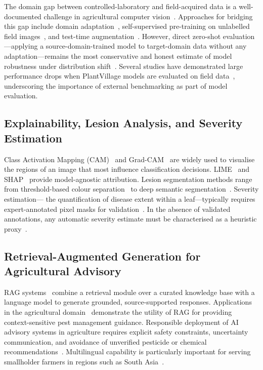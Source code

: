 \documentclass[conference]{IEEEtran}
\begin{document}
The domain gap between controlled-laboratory and field-acquired data is a
well-documented challenge in agricultural computer vision~\cite{barbedo2018factors,
sun2016deep}. Approaches for bridging this gap include domain adaptation~\cite{ganin2015unsupervised,long2015learning},
self-supervised pre-training on unlabelled field images~\cite{chen2020simple,he2020momentum},
and test-time augmentation~\cite{krizhevsky2012imagenet}. However, direct
zero-shot evaluation---applying a source-domain-trained model to target-domain
data without any adaptation---remains the most conservative and honest estimate
of model robustness under distribution shift~\cite{torralba2011unbiased}.
Several studies have demonstrated large performance drops when PlantVillage
models are evaluated on field data~\cite{singh2020plantdoc,chen2020using,
thenmozhi2019crop,fuentes2017robust}, underscoring the importance of external
benchmarking as part of model evaluation.

\subsection{Explainability, Lesion Analysis, and Severity Estimation}

Class Activation Mapping (CAM)~\cite{zhou2016learning} and Grad-CAM~\cite{selvaraju2017gradcam}
are widely used to visualise the regions of an image that most influence
classification decisions. LIME~\cite{ribeiro2016should} and SHAP~\cite{lundberg2017shap}
provide model-agnostic attribution. Lesion segmentation methods range from
threshold-based colour separation~\cite{phadikar2013rice} to deep semantic
segmentation~\cite{long2015fully,ronneberger2015unet}. Severity estimation---
the quantification of disease extent within a leaf---typically requires expert-annotated
pixel masks for validation~\cite{bock2010plant,francl1997quantifying}. In the
absence of validated annotations, any automatic severity estimate must be
characterised as a heuristic
proxy~\cite{mahlein2012development,barbedo2014review}.

\subsection{Retrieval-Augmented Generation for Agricultural Advisory}

RAG systems~\cite{lewis2020retrieval} combine a retrieval module over a curated
knowledge base with a language model to generate grounded, source-supported
responses. Applications in the agricultural domain~\cite{gupta2023indiaai,
meena2023plantgpt,xu2023agri} demonstrate the utility of RAG for providing
context-sensitive pest management guidance. Responsible deployment of AI advisory
systems in agriculture requires explicit safety constraints, uncertainty
communication, and avoidance of unverified pesticide or chemical
recommendations~\cite{rolnick2022tackling,jobin2019global,
floridi2019establishing}. Multilingual capability is particularly important
for serving smallholder farmers in regions such as South Asia~\cite{sujatha2021performance,
dwivedi2022multilingual}.
\end{document}
